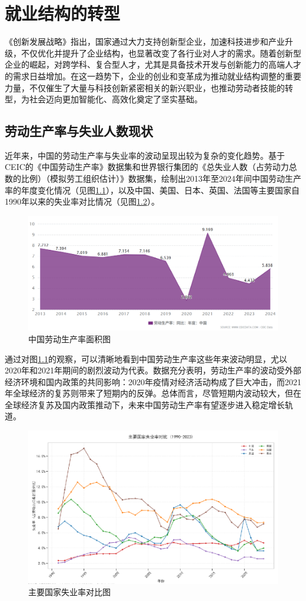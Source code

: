 \chapter{就业结构的转型}
\label{chapter:struct}
《创新发展战略》指出，国家通过大力支持创新型企业，加速科技进步和产业升级，不仅优化并提升了企业结构，也显著改变了各行业对人才的需求。随着创新型企业的崛起，对跨学科、复合型人才，尤其是具备技术开发与创新能力的高端人才的需求日益增加。在这一趋势下，企业的创业和变革成为推动就业结构调整的重要力量，不仅催生了大量与科技创新紧密相关的新兴职业，也推动劳动者技能的转型，为社会迈向更加智能化、高效化奠定了坚实基础。

\section{劳动生产率与失业人数现状}
近年来，中国的劳动生产率与失业率的波动呈现出较为复杂的变化趋势。基于CEIC的《中国劳动生产率》数据集和世界银行集团的《总失业人数（占劳动力总数的比例）（模拟劳工组织估计）》数据集，绘制出2013年至2024年间中国劳动生产率的年度变化情况（见图\ref{中国劳动生产率}），以及中国、美国、日本、英国、法国等主要国家自1990年以来的失业率对比情况（见图\ref{主要国家失业率对比}）。
\begin{figure}[H]
    \centering
    \includegraphics[width=0.7\linewidth]{figure/15中国劳动生产率.png}
    \caption{中国劳动生产率面积图}
    \label{中国劳动生产率}
\end{figure}
通过对图\ref{中国劳动生产率}的观察，可以清晰地看到中国劳动生产率这些年来波动明显，尤以2020年和2021年期间的剧烈波动为代表。数据充分表明，劳动生产率的波动受外部经济环境和国内政策的共同影响：2020年疫情对经济活动构成了巨大冲击，而2021年全球经济的复苏则带来了短期内的反弹。总体而言，尽管短期内波动较大，但在全球经济复苏及国内政策推动下，未来中国劳动生产率有望逐步进入稳定增长轨道。
\begin{figure}[H]
    \centering
    \includegraphics[width=0.7\linewidth]{figure/16主要国家失业率对比.png}
    \caption{主要国家失业率对比图}
    \label{主要国家失业率对比}
\end{figure}
